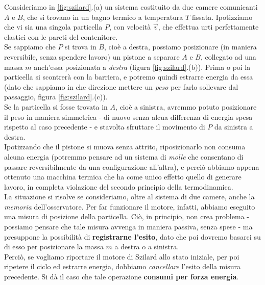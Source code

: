 \documentclass[../../InformazioneQuantistica.tex]{subfiles}
\begin{document}
Consideriamo in \ref{fig:szilard}.(a) un sistema costituito da due camere comunicanti $A$ e $B$, che si trovano in un bagno termico a temperatura $T$ fissata. Ipotizziamo che vi sia una singola particella $P$, con velocità $\vec{v}$, che effettua urti perfettamente elastici con le pareti del contenitore.\\
Se sappiamo che $P$ si trova in $B$, cioè a destra, possiamo posizionare (in maniera reversibile, senza spendere lavoro) un pistone a separare $A$ e $B$, collegato ad una massa $m$ anch'essa posizionata a \textit{destra} (figura \ref{fig:szilard}.(b)). Prima o poi la particella si scontrerà con la barriera, e potremo quindi estrarre energia da essa (dato che sappiamo in che direzione mettere un \textit{peso} per farlo sollevare dal passaggio, figura \ref{fig:szilard}.(c)).\\
Se la particella si fosse trovata in $A$, cioè a sinistra, avremmo potuto posizionare il peso in maniera simmetrica - di nuovo senza alcua differenza di energia spesa rispetto al caso precedente - e stavolta sfruttare il movimento di $P$ da sinistra a destra.\\
Ipotizzando che il pistone si muova senza attrito, riposizionarlo non consuma alcuna energia (potremmo pensare ad un sistema di \textit{molle} che consentano di passare reversibilmente da una configurazione all'altra), e perciò abbiamo appena ottenuto una macchina termica che ha come unico effetto quello di generare lavoro, in completa violazione del secondo principio della termodinamica.\\

La situazione si risolve se consideriamo, oltre al sistema di due camere, anche la \textit{memoria} dell'osservatore. Per far funzionare il motore, infatti, abbiamo eseguito una misura di posizione della particella. Ciò, in principio, non crea problema - possiamo pensare che tale misura avvenga in maniera passiva, senza spese - ma presuppone la possibilità di \textbf{registrarne l'esito}, dato che poi dovremo basarci su di esso per posizionare la massa $m$ a destra o a sinistra.\\
Perciò, se vogliamo riportare il motore di Szilard allo stato iniziale, per poi ripetere il ciclo ed estrarre energia, dobbiamo \textit{cancellare} l'esito della misura precedente. Si dà il caso che tale operazione \textbf{consumi per forza energia}.\\
\end{document}
